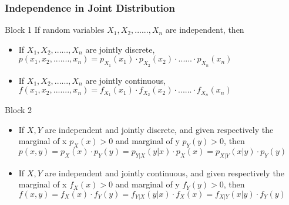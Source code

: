\documentclass{beamer}
\begin{document}


\begin{frame}
\frametitle{Independence in Joint Distribution}
\begin{block}{Block 1}
If random variables $X_1, X_2, ...... , X_n$ are independent, then
\begin{itemize}
\item If $X_1, X_2, ......, X_n$ are jointly discrete, $p(x_1, x_2, ......., x_n) = p_{X_1}(x_1) \cdot p_{X_2}(x_2) \cdot ...... \cdot p_{X_n}(x_n)$
\item If $X_1, X_2, ......, X_n$ are jointly continuous, $f(x_1, x_2, ......., x_n) = f_{X_1}(x_1) \cdot f_{X_2}(x_2) \cdot ...... \cdot f_{X_n}(x_n)$
\end{itemize}
\end{block}

\begin{block}{Block 2}
\begin{itemize}
\item If $X,Y$ are independent and jointly discrete, and given respectively the marginal of x $p_X(x)>0$ and marginal of y $p_Y(y)>0$, then $p(x,y) = p_{X}(x) \cdot p_{Y}(y) = p_{Y|X}(y|x) \cdot p_{X}(x) = p_{X|Y}(x|y) \cdot p_{Y}(y)$
\item If $X,Y$ are independent and jointly continuous, and given respectively the marginal of x $f_X(x)>0$ and marginal of y $f_Y(y)>0$, then $f(x,y) = f_{X}(x) \cdot f_{Y}(y) = f_{Y|X}(y|x) \cdot f_{X}(x) = f_{X|Y}(x|y) \cdot f_{Y}(y)$
\end{itemize}
\end{block}


\end{frame}

\end{document}
